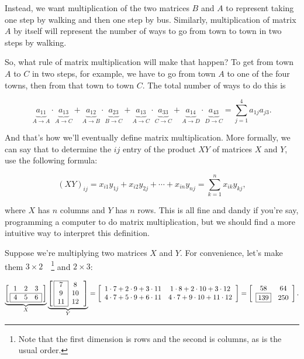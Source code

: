 \documentclass[../gatm.tex]{subfiles}
\begin{document}
Instead, we want multiplication of the two matrices $B$ and $A$ to represent taking one step by walking and then one step by bus. Similarly, multiplication of matrix $A$ by itself will represent the number of ways to go from town to town in two steps by walking.

So, what rule of matrix multiplication will make that happen? To get from town $A$ to $C$ in two steps, for example, we have to go from town $A$ to one of the four towns, then from that town to town $C$. The total number of ways to do this is

$$\underbrace{a_{11}}_{A\to A}\cdot \underbrace{a_{13}}_{A\to C}+\underbrace{a_{12}}_{A\to B}\cdot \underbrace{a_{23}}_{B\to C}+\underbrace{a_{13}}_{A\to C}\cdot \underbrace{a_{33}}_{C\to C}+\underbrace{a_{14}}_{A\to D}\cdot \underbrace{a_{43}}_{D\to C}=\sum_{j=1}^{4}a_{1j}a_{j3}.$$

And that's how we'll eventually define matrix multiplication. More formally, we can say that to determine the $ij$ entry of the product $XY$ of matrices $X$ and $Y$, use the following formula:

$$(XY)_{ij}=x_{i1}y_{1j}+x_{i2}y_{2j}+\cdots + x_{in}y_{nj} = \sum_{k=1}^n x_{ik} y_{kj},$$

where $X$ has $n$ columns and $Y$ has $n$ rows. This is all fine and dandy if you're say, programming a computer to do matrix multiplication, but we should find a more intuitive way to interpret this definition.

Suppose we're multiplying two matrices $X$ and $Y$. For convenience, let's make them $3\times 2\quad$\footnote{Note that the first dimension is rows and the second is columns, as is the usual order.} and $2\times 3$:

\begin{center}
$$\underbrace{\left[\,\begin{array}{ccc}
1                      & 2 & 3                      \\ \hline
\multicolumn{1}{|l}{4} & 5 & \multicolumn{1}{l|}{6} \\ \hline
\end{array}\,\right]}_{X}\underbrace{\left[\,\begin{array}{|c|c}
\cline{1-1}
7  & 8  \\
9  & 10 \\
11 & 12 \\ \cline{1-1}
\end{array}\,\right]}_{Y}=\left[\begin{array}{cc}
1\cdot 7 + 2\cdot 9 + 3\cdot 11 & 1\cdot 8 + 2\cdot 10 + 3\cdot 12 \\
4\cdot 7 + 5\cdot 9 + 6\cdot 11 & 4\cdot 7 + 9\cdot 10 + 11\cdot 12 \\
\end{array}
\right]=\left[\begin{array}{cc}
58 & 64 \\
\boxed{139} & 250 \\
\end{array}\right].$$
\end{center}
\end{document}
